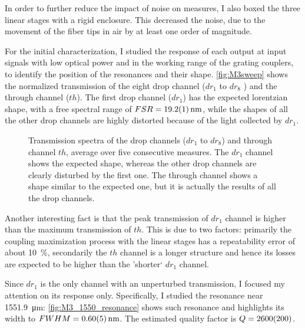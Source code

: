 In order to further reduce the impact of noise on measures, I also boxed the three linear stages with a rigid enclosure.
This decreased the noise, due to the movement of the fiber tips in air by at least one order of magnitude.

For the initial characterization, I studied the response of each output at input signals with low optical power and in the working range of the grating couplers, to identify the position of the resonances and their shape.
\autoref{fig:M3sweep} shows the normalized transmission of the eight drop channel ($dr_1$ to $dr_8$ ) and the through channel ($th$).
The first drop channel ($dr_1$) has the expected lorentzian shape, with a free spectral range of $FSR=\SI{19.2+-.1}{\nm}$, while the shapes of all the other drop channels are highly distorted because of the light collected by $dr_1$.

\begin{figure}[htbp]
	\centering
%	
%	
	
	\caption{
		Transmission spectra of the drop channels ($dr_1$ to $dr_8$) and through channel $th$, average over five consecutive measures.
		The $dr_1$ channel shows the expected shape, whereas the other drop channels are clearly disturbed by the first one.
		The through channel shows a shape similar to the expected one, but it is actually the results of all the drop channels.
	}
	\label{fig:M3sweep}
\end{figure}

Another interesting fact is that the peak transmission of $dr_1$ channel is higher than the maximum transmission of $th$.
This is due to two factors: primarily the coupling maximization process with the linear stages has a repeatability error of about \SI{10}{\percent}, secondarily the $th$ channel is a longer structure and hence its losses are expected to be higher than the 'shorter` $dr_1$ channel.

Since $dr_1$ is the only channel with an unperturbed transmission, I focused my attention on its response only.
Specifically, I studied the resonance near \SI{1551.9}{\um}: %
\autoref{fig:M3_1550_resonance} shows such resonance and highlights its width to $FWHM=\SI{0.6+-0.05}{\nm}$.
The estimated quality factor is $Q=\num{2600+-200}$.

